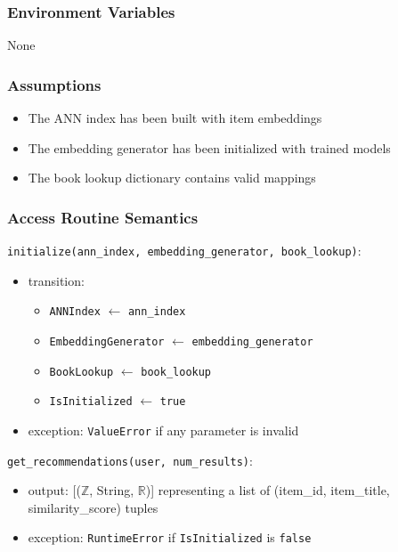 \documentclass[12pt, titlepage]{article}
\begin{document}
\subsubsection{Environment Variables}

None

\subsubsection{Assumptions}

\begin{itemize}
  \item The ANN index has been built with item embeddings
  \item The embedding generator has been initialized with trained models
  \item The book lookup dictionary contains valid mappings
\end{itemize}

\subsubsection{Access Routine Semantics}

\noindent \texttt{initialize(ann\_index, embedding\_generator, book\_lookup)}:
\begin{itemize}
  \item transition:
  \begin{itemize}
    \item \texttt{ANNIndex} $\leftarrow$ \texttt{ann\_index}
    \item \texttt{EmbeddingGenerator} $\leftarrow$ \texttt{embedding\_generator}
    \item \texttt{BookLookup} $\leftarrow$ \texttt{book\_lookup}
    \item \texttt{IsInitialized} $\leftarrow$ \texttt{true}
  \end{itemize}
  \item exception: \texttt{ValueError} if any parameter is invalid
\end{itemize}

\noindent \texttt{get\_recommendations(user, num\_results)}:
\begin{itemize}
  \item output: [($\mathbb{Z}$, String, $\mathbb{R}$)] representing a list of (item\_id, item\_title, similarity\_score) tuples
  \item exception: \texttt{RuntimeError} if \texttt{IsInitialized} is \texttt{false}
\end{itemize}
\end{document}
